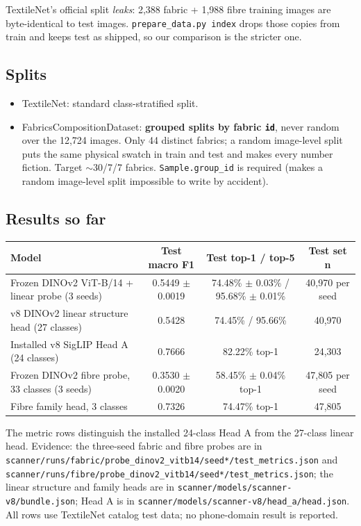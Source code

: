 \documentclass[11pt,a4paper]{article}
\begin{document}
TextileNet's official split \emph{leaks}: 2,388 fabric + 1,988 fibre training images
are byte-identical to test images. \texttt{prepare\_data.py index} drops those
copies from train and keeps test as shipped, so our comparison is the stricter one.

\subsection{Splits}

\begin{itemize}[leftmargin=*]
  \item TextileNet: standard class-stratified split.
  \item FabricsCompositionDataset: \textbf{grouped splits by fabric \texttt{id}},
        never random over the 12,724 images. Only 44 distinct fabrics; a random
        image-level split puts the same physical swatch in train and test and makes
        every number fiction. Target $\sim$30/7/7 fabrics. \texttt{Sample.group\_id}
        is required (makes a random image-level split impossible to write by accident).
\end{itemize}

\subsection{Results so far}

\begin{table}[h]
\centering
\begin{tabular}{lccc}
\toprule
Model & Test macro F1 & Test top-1 / top-5 & Test set n \\
\midrule
Frozen DINOv2 ViT-B/14 + linear probe (3 seeds) & 0.5449 $\pm$ 0.0019 & 74.48\% $\pm$ 0.03\% / 95.68\% $\pm$ 0.01\% & 40{,}970 per seed \\
v8 DINOv2 linear structure head (27 classes) & 0.5428 & 74.45\% / 95.66\% & 40{,}970 \\
Installed v8 SigLIP Head A (24 classes) & 0.7666 & 82.22\% top-1 & 24{,}303 \\
Frozen DINOv2 fibre probe, 33 classes (3 seeds) & 0.3530 $\pm$ 0.0020 & 58.45\% $\pm$ 0.04\% top-1 & 47{,}805 per seed \\
Fibre family head, 3 classes & 0.7326 & 74.47\% top-1 & 47{,}805 \\
\bottomrule
\end{tabular}
\end{table}

The metric rows distinguish the installed 24-class Head A from the 27-class linear
head. Evidence: the three-seed fabric and fibre probes are in
\texttt{scanner/runs/fabric/probe\_dinov2\_vitb14/seed*/test\_metrics.json} and
\texttt{scanner/runs/fibre/probe\_dinov2\_vitb14/seed*/test\_metrics.json}; the
linear structure and family heads are in \texttt{scanner/models/scanner-v8/bundle.json};
Head A is in \texttt{scanner/models/scanner-v8/head\_a/head.json}. All rows use
TextileNet catalog test data; no phone-domain result is reported.
\end{document}
